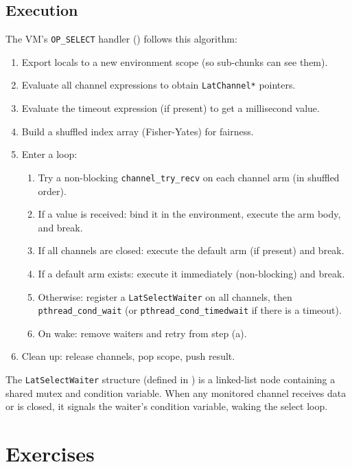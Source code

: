 \subsection{Execution}

The VM's \lstinline|OP_SELECT| handler () follows this algorithm:

\begin{enumerate}
  \item Export locals to a new environment scope (so sub-chunks can see them).
  \item Evaluate all channel expressions to obtain \texttt{LatChannel*} pointers.
  \item Evaluate the timeout expression (if present) to get a millisecond value.
  \item Build a shuffled index array (Fisher-Yates) for fairness.
  \item Enter a loop:
    \begin{enumerate}
      \item Try a non-blocking \texttt{channel\_try\_recv} on each channel arm (in shuffled order).
      \item If a value is received: bind it in the environment, execute the arm body, and break.
      \item If all channels are closed: execute the default arm (if present) and break.
      \item If a default arm exists: execute it immediately (non-blocking) and break.
      \item Otherwise: register a \texttt{LatSelectWaiter} on all channels, then \texttt{pthread\_cond\_wait} (or \texttt{pthread\_cond\_timedwait} if there is a timeout).
      \item On wake: remove waiters and retry from step (a).
    \end{enumerate}
  \item Clean up: release channels, pop scope, push result.
\end{enumerate}

The \texttt{LatSelectWaiter} structure (defined in ) is a linked-list node containing a shared mutex and condition variable.
When any monitored channel receives data or is closed, it signals the waiter's condition variable, waking the select loop.

\section{Exercises}\label{sec:ch20-exercises}

